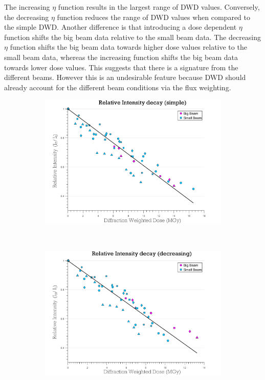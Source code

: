 The increasing $\eta$ function results in the largest range of DWD values.
Conversely, the decreasing $\eta$ function reduces the range of DWD values when compared to the simple DWD.
Another difference is that introducing a dose dependent $\eta$ function shifts the big beam data relative to the small beam data.
The decreasing $\eta$ function shifts the big beam data towards higher dose values relative to the small beam data, whereas the increasing function shifts the big beam data towards lower dose values.
This suggests that there is a signature from the different beams.
However this is an undesirable feature because DWD should already account for the different beam conditions via the flux weighting.
\begin{figure}
	\centering
    \begin{subfigure}[b]{1\textwidth}
        \centering
        \includegraphics[width=\textwidth]{figures/dwd/reproduce_relint_DWDsimple.pdf}
        \caption{}
        \label{fig:Relative intensity - Simple DWD}
    \end{subfigure}
    \\
	\begin{subfigure}[b]{1\textwidth}
        \centering
        \includegraphics[width=\textwidth]{figures/dwd/reproduce_relint_DWDwrong.pdf}
        \caption{}
        \label{fig:Relative intensity - Increasing Eta}
    \end{subfigure}
\end{figure}
